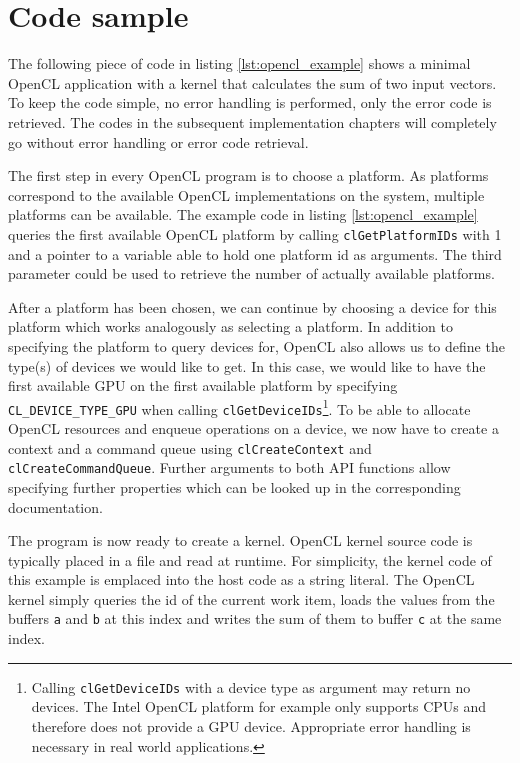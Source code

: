 \section{Code sample}
\label{sec:code_sample}

The following piece of code in listing \ref{lst:opencl_example} shows a minimal OpenCL application with a kernel that calculates the sum of two input vectors. To keep the code simple, no error handling is performed, only the error code is retrieved. The codes in the subsequent implementation chapters will completely go without error handling or error code retrieval.



The first step in every OpenCL program is to choose a platform. As platforms correspond to the available OpenCL implementations on the system, multiple platforms can be available. The example code in listing \ref{lst:opencl_example} queries the first available OpenCL platform by calling \lstinline!clGetPlatformIDs! with 1 and a pointer to a variable able to hold one platform id as arguments. The third parameter could be used to retrieve the number of actually available platforms.

After a platform has been chosen, we can continue by choosing a device for this platform which works analogously as selecting a platform. In addition to specifying the platform to query devices for, OpenCL also allows us to define the type(s) of devices we would like to get. In this case, we would like to have the first available GPU on the first available platform by specifying \lstinline!CL_DEVICE_TYPE_GPU! when calling \lstinline!clGetDeviceIDs!\footnote{Calling \lstinline!clGetDeviceIDs! with a device type as argument may return no devices. The Intel OpenCL platform for example only supports CPUs and therefore does not provide a GPU device. Appropriate error handling is necessary in real world applications.}. To be able to allocate OpenCL resources and enqueue operations on a device, we now have to create a context and a command queue using \lstinline!clCreateContext! and \lstinline!clCreateCommandQueue!. Further arguments to both API functions allow specifying further properties which can be looked up in the corresponding documentation.

The program is now ready to create a kernel. OpenCL kernel source code is typically placed in a file and read at runtime. For simplicity, the kernel code of this example is emplaced into the host code as a string literal. The OpenCL kernel simply queries the id of the current work item, loads the values from the buffers \lstinline!a! and \lstinline!b! at this index and writes the sum of them to buffer \lstinline!c! at the same index.

